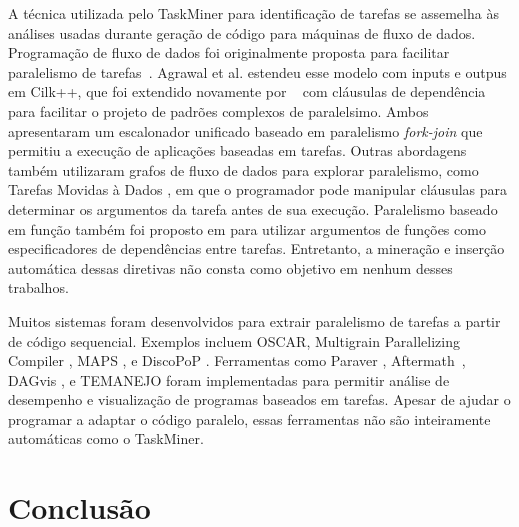 \documentclass[sigplan,10pt,review]{acmart}
\newcommand\Taskminer{\mbox{\textsf{TaskMiner}}}
\begin{document}
A técnica utilizada pelo {\Taskminer} para identificação de tarefas se assemelha às análises usadas durante
geração de código para máquinas de fluxo de dados. Programação de fluxo de dados foi originalmente proposta 
para facilitar paralelismo de tarefas~\cite{agrawal:ipdps:2010, chan:spaa:2007,
gupta:micro:2011}. Agrawal et al. \cite{agrawal:ipdps:2010} estendeu esse modelo
com inputs e outpus em Cilk++, que foi extendido novamente por ~\cite{vandierendonck:hotpar:2011} 
com cláusulas de dependência para facilitar
o projeto de padrões complexos de paralelsimo. Ambos apresentaram um escalonador unificado
baseado em paralelismo \textit{fork-join} \cite{vandierendonck:pact:2011} que permitiu
a execução de aplicações baseadas em tarefas. Outras abordagens também utilizaram grafos
de fluxo de dados para explorar paralelismo, como Tarefas Movidas à Dados \cite{tasirlar:icpp:2011},
em que o programador pode manipular cláusulas para determinar os argumentos da tarefa
antes de sua execução. Paralelismo baseado em função também foi proposto em \cite{gupta:micro:2011}
para utilizar argumentos de funções como especificadores de dependências entre tarefas.
Entretanto, a mineração e inserção automática dessas diretivas não consta como objetivo
em nenhum desses trabalhos.

Muitos sistemas foram desenvolvidos para extrair paralelismo de tarefas a partir de código sequencial.
Exemplos incluem OSCAR, Multigrain Parallelizing
Compiler \cite{ishizaka:journal:2000, kasahara:iwlcpc:2000},  MAPS \cite{castrillon:tii:2013, ceng:dac:2008}, e
DiscoPoP \cite{discopop, li:jss:2016}. Ferramentas como Paraver \cite{extrae, paraver},
Aftermath~\cite{drebes:hipeac:2014}, DAGvis \cite{huynh:wvpa:2015}, e TEMANEJO
\cite{brinkmann:parco:2011, brinkmann:journal:2013, temanejo} foram implementadas para 
permitir análise de desempenho e visualização de programas baseados em tarefas.
Apesar de ajudar o programar a adaptar o código paralelo, essas ferramentas não são 
inteiramente automáticas como o {\Taskminer}.


\section{Conclus\~{a}o}
\label{sec:conc}



\end{document}
